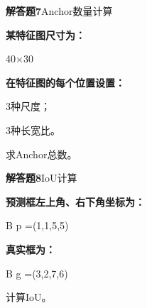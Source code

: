 \documentclass[UTF8,openany,oneside,zihao=-4,fontset=windows]{ctexbook}
\newif\ifshowsolutions
\newcommand{\Question}[2]{%
  \par\Needspace{4\baselineskip}\medskip
  \noindent\textbf{\color{MVBlue}#1}\quad #2\par
}
\newenvironment{AnswerBox}{\begin{tcolorbox}[breakable,colback=MVLight,colframe=MVBlue!45,title={参考答案},fonttitle=\bfseries,boxrule=0.55pt,arc=1.5mm,left=2mm,right=2mm,top=1.5mm,bottom=1.5mm]}{\end{tcolorbox}}
\newcommand{\PracticeSpace}[1]{\ifshowsolutions\else\par\vspace{#1}\par\fi}
\begin{document}
\else
\PracticeSpace{4.2cm}
\fi
\Question{解答题7}{Anchor数量计算}
\par\noindent\textbf{某特征图尺寸为：}
\par 40×30
\par\noindent\textbf{在特征图的每个位置设置：}
\par\noindent\textbullet\quad 3种尺度；
\par 3种长宽比。
\par 求Anchor总数。
\ifshowsolutions
\begin{AnswerBox}
\par\noindent\textbf{每个位置Anchor数量：}
\par 3×3=9
\par\noindent\textbf{特征图位置总数：}
\par 40×30=1200
\par\noindent\textbf{因此Anchor总数：}
\par 1200×9=10800
\par\noindent\textbf{所以：}
\par 10800
\end{AnswerBox}
\else
\PracticeSpace{4.2cm}
\fi
\Question{解答题8}{IoU计算}
\par\noindent\textbf{预测框左上角、右下角坐标为：}
\begin{center}\small\ttfamily B p =(1,1,5,5)\end{center}
\par\noindent\textbf{真实框为：}
\begin{center}\small\ttfamily B g =(3,2,7,6)\end{center}
\par 计算IoU。
\ifshowsolutions
\end{document}
